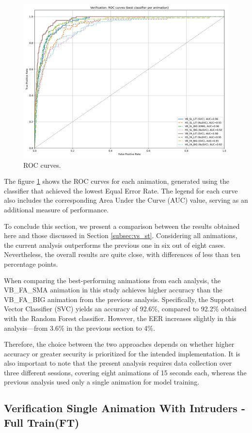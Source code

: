 \documentclass[12pt]{report}
\begin{document}
\begin{figure}[ht]
    \centering
    \includegraphics[width = 0.6
    \textwidth]{Images/Results/Verification_single/ft/best_animation_roc_curves_ft.png}
    \caption{ROC curves.}
    \label{fig:roc_ft}
\end{figure}

The figure \ref{fig:roc_ft} shows the ROC curves for each animation, generated using the classifier that achieved the lowest Equal Error Rate. 
The legend for each curve also includes the corresponding Area Under the Curve (AUC) value, serving as an additional measure of performance.

To conclude this section, we present a comparison between the results obtained here and those discussed in Section \ref{subsec:vs_st}. 
Considering all animations, the current analysis outperforms the previous one in six out of eight cases. 
Nevertheless, the overall results are quite close, with differences of less than ten percentage points.

When comparing the best-performing animations from each analysis, the VB\_FA\_SMA animation in this study achieves higher accuracy than the VB\_FA\_BIG animation from the previous analysis. 
Specifically, the Support Vector Classifier (SVC) yields an accuracy of 92.6\%, compared to 92.2\% obtained with the Random Forest classifier. 
However, the EER increases slightly in this analysis—from 3.6\% in the previous section to 4\%.

Therefore, the choice between the two approaches depends on whether higher accuracy or greater security is prioritized for the intended implementation. 
It is also important to note that the present analysis requires data collection over three different sessions, covering eight animations of 15 seconds each, whereas the previous analysis used only a single animation for model training.
\FloatBarrier

\subsection{Verification Single Animation With Intruders - Full Train(FT)}
\label{subsec:intruders}
\end{document}
